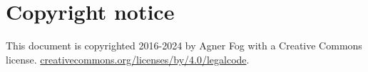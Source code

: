 \documentclass[forwardcom.tex]{subfiles}
\begin{document}
\RaggedRight

\chapter{Copyright notice}
This document is copyrighted 2016-2024 by Agner Fog with a Creative Commons license.
\href{https://creativecommons.org/licenses/by/4.0/legalcode}{creativecommons.org/licenses/by/4.0/legalcode}.
\end{document}
